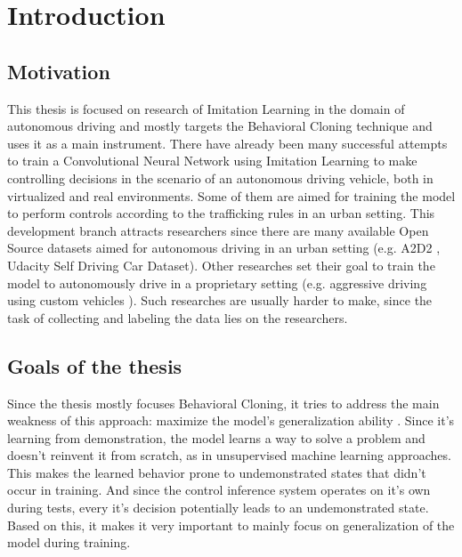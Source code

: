 \chapter{Introduction}
\label{cha:Introduction}

\section{Motivation}

This thesis is focused on research of Imitation Learning in the domain of autonomous driving and mostly targets the Behavioral Cloning technique and uses it as a main instrument. There have already been many successful attempts to train a Convolutional Neural Network using Imitation Learning to make controlling decisions in the scenario of an autonomous driving vehicle, both in virtualized \autocite{8855753} and real \autocite{pan2019agileautonomousdrivingusing} \autocite{bojarski2016endendlearningselfdriving} environments. Some of them are aimed for training the model to perform controls according to the trafficking rules in an urban setting. This development branch attracts researchers since there are many available Open Source datasets aimed for autonomous driving in an urban setting (e.g. A2D2 \autocite{geyer2020a2d2audiautonomousdriving}, Udacity Self Driving Car Dataset). Other researches set their goal to train the model to autonomously drive in a proprietary setting (e.g. aggressive driving using custom vehicles \autocite{drews2017aggressivedeepdrivingmodel}). Such researches are usually harder to make, since the task of collecting and labeling the data lies on the researchers.

\section{Goals of the thesis}

Since the thesis mostly focuses Behavioral Cloning, it tries to address the main weakness of this approach: maximize the model's generalization ability \autocite{ARGALL2009469}. Since it's learning from demonstration, the model learns a way to solve a problem and doesn't reinvent it from scratch, as in unsupervised machine learning approaches. This makes the learned behavior prone to undemonstrated states that didn't occur in training. And since the control inference system operates on it's own during tests, every it's decision potentially leads to an undemonstrated state. Based on this, it makes it very important to mainly focus on generalization of the model during training.

